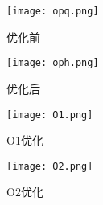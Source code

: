 \documentclass[lang=cn,11pt,a4paper,cite=authoryear]{elegantpaper}
\begin{document}
\begin{figure}[htbp]
  \centering
  \texttt{[image: opq.png]}
  \caption{优化前}
\end{figure}

\begin{figure}[htbp]
  \centering
  \texttt{[image: oph.png]}
  \caption{优化后}
\end{figure}

\begin{figure}[htbp]
  \centering
  \texttt{[image: O1.png]}
  \caption{O1优化}
\end{figure}

\begin{figure}[htbp]
  \centering
  \texttt{[image: O2.png]}
  \caption{O2优化}
\end{figure}
\end{document}
